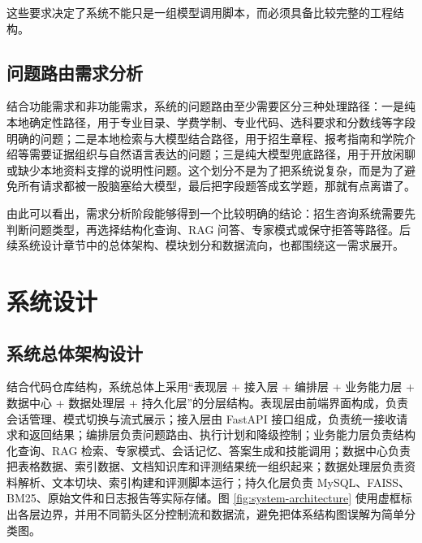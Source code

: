 \documentclass[UTF8,zihao=-4,oneside]{ctexbook}
\numberwithin{equation}{chapter}
\begin{document}
这些要求决定了系统不能只是一组模型调用脚本，而必须具备比较完整的工程结构。

\section{问题路由需求分析}
结合功能需求和非功能需求，系统的问题路由至少需要区分三种处理路径：一是纯本地确定性路径，用于专业目录、学费学制、专业代码、选科要求和分数线等字段明确的问题；二是本地检索与大模型结合路径，用于招生章程、报考指南和学院介绍等需要证据组织与自然语言表达的问题；三是纯大模型兜底路径，用于开放闲聊或缺少本地资料支撑的说明性问题。这个划分不是为了把系统说复杂，而是为了避免所有请求都被一股脑塞给大模型，最后把字段题答成玄学题，那就有点离谱了。

由此可以看出，需求分析阶段能够得到一个比较明确的结论：招生咨询系统需要先判断问题类型，再选择结构化查询、RAG 问答、专家模式或保守拒答等路径。后续系统设计章节中的总体架构、模块划分和数据流向，也都围绕这一需求展开。

\chapter{系统设计}

\section{系统总体架构设计}
结合代码仓库结构，系统总体上采用“表现层 + 接入层 + 编排层 + 业务能力层 + 数据中心 + 数据处理层 + 持久化层”的分层结构\cite{projectanalysis}。表现层由前端界面构成，负责会话管理、模式切换与流式展示；接入层由 FastAPI 接口组成，负责统一接收请求和返回结果；编排层负责问题路由、执行计划和降级控制；业务能力层负责结构化查询、RAG 检索、专家模式、会话记忆、答案生成和技能调用；数据中心负责把表格数据、索引数据、文档知识库和评测结果统一组织起来；数据处理层负责资料解析、文本切块、索引构建和评测脚本运行；持久化层负责 MySQL、FAISS、BM25、原始文件和日志报告等实际存储。图 \ref{fig:system-architecture} 使用虚框标出各层边界，并用不同箭头区分控制流和数据流，避免把体系结构图误解为简单分类图。
\end{document}
